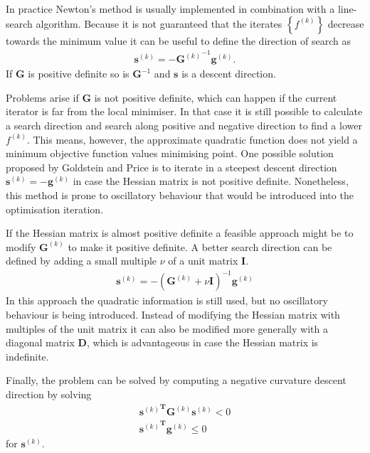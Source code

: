 In practice Newton's method is usually implemented in combination with a
line-search algorithm. Because it is not guaranteed that the iterates
$\left\{f^{(k)}\right\}$ decrease towards the minimum value it can be useful to
define the direction of search as
%
\begin{align}
    \mathbf{s}^{(k)}=-{\mathbf{G}^{(k)}}^{-1}\mathbf{g}^{(k)}.
\end{align}
%
If $\mathbf{G}$ is positive definite so is $\mathbf{G}^{-1}$ and $\mathbf{s}$ is
a descent direction.

Problems arise if $\mathbf{G}$ is not positive definite, which can happen if
the current iterator is far from the local minimiser. In that case it is still
possible to calculate a search direction and search along positive and negative
direction to find a lower $f^{(k)}$. This means, however, the approximate
quadratic function does not yield a minimum objective function values
minimising point. One possible solution proposed by Goldstein and
Price\autocite{Goldstein_effectivealgorithmminimization_1967} is to iterate in
a steepest descent direction $\mathbf{s}^{(k)}=-\mathbf{g}^{(k)}$ in case the
Hessian matrix is not positive definite. Nonetheless, this method is prone to
oscillatory behaviour that would be introduced into the optimisation iteration.

If the Hessian matrix is almost positive definite a feasible approach might be
to modify $\mathbf{G}^{(k)}$ to make it positive definite. A better search
direction can be defined by adding a small multiple $\nu$ of a unit matrix
$\mathbf{I}$.
\autocite{Levenberg_methodsolutioncertain_1944,Marquardt_AlgorithmLeastSquaresEstimation_1963,Goldfeld_MaximizationQuadraticHillClimbing_1966}
%
\begin{align}
\mathbf{s}^{(k)}=-\left(\mathbf{G}^{(k)}+\nu\mathbf{I}\right)^{-1}\mathbf{g}^{(k)}
\end{align}
%
In this approach the quadratic information is still used, but no oscillatory
behaviour is being introduced. Instead of modifying the Hessian matrix with
multiples of the unit matrix it can also be modified more generally with a
diagonal matrix $\mathbf{D}$, which is advantageous in case the Hessian matrix
is indefinite.
\autocite{Murray_Secondderivativemethods_1972,Hebden_algorithmminimizationusing_1973}

Finally, the problem can be solved by computing a negative curvature descent
direction by solving
%
\begin{align}
    {\mathbf{s}^{(k)}}^\mathbf{T}\mathbf{G}^{(k)}\mathbf{s}^{(k)}<0\\
    {\mathbf{s}^{(k)}}^\mathbf{T}\mathbf{g}^{(k)}\leq0
\end{align}
for $\mathbf{s}^{(k)}$.\autocite{Fiacco_NonlinearProgramming_1990}


